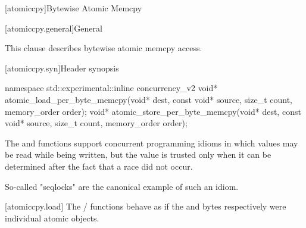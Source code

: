 
[atomiccpy]{Bytewise Atomic Memcpy}

[atomiccpy.general]{General}

This clause describes bytewise atomic memcpy access. 


[atomiccpy.syn]{Header  synopsis}

\begin{codeblock}
namespace std::experimental::inline concurrency_v2 {
  void* atomic_load_per_byte_memcpy(void* dest, const void* source, size_t count, memory_order order);
  void* atomic_store_per_byte_memcpy(void* dest, const void* source, size_t count, memory_order order);
}
\end{codeblock}

\pnum

The  and
 functions support concurrent
programming idioms in which values may be read while being written, but
the value is trusted only when it can be determined after the fact that
a race did not occur. \begin{note} So-called "seqlocks" are the canonical
example of such an idiom. \end{note}


[atomiccpy.load]{}
\pnum
The  /
 functions behave as if the
 and  bytes respectively were individual
atomic objects.

\textbf{}

